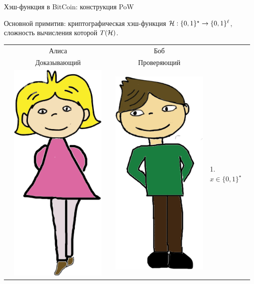 \documentclass[usenames,dvipsnames,8pt,aspectratio=169]{beamer}
\begin{document}
\begin{frame}{Хэш-функция в  BitCoin: конструкция PoW}

\large
Основной примитив: криптографическая хэш-функция  $\mathcal{H}:\{0,1\}^\star \rightarrow \{0,1\}^\ell$, сложность вычисления которой $T(\mathcal{H})$.

\vspace{10pt}
	\begin{tabular}{l c c c l}
		& Алиса  & & Боб &  \\
		& Доказывающий  & & Проверяющий &  \\[3pt]
		& \multirow{5}{*}{\includegraphics[scale=0.15]{Alice}} & & 
		\multirow{5}{*}{\includegraphics[scale=0.15]{Bob}} &  1. $x \in \{0,1\}^{\star}$   \\

\end{tabular}
\end{frame}
\end{document}
